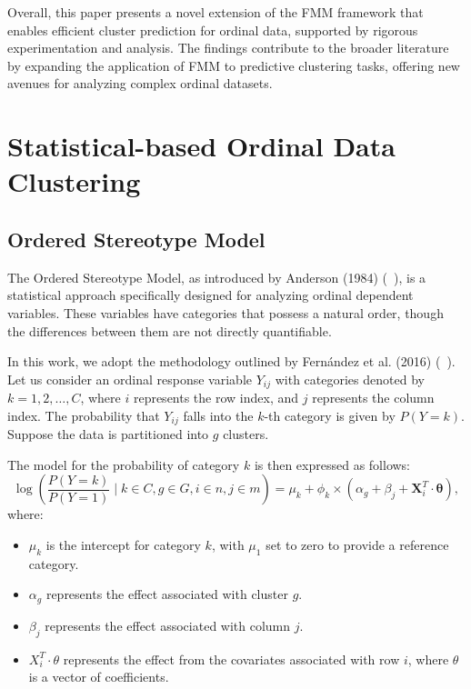 \documentclass{article}
\begin{document}
Overall, this paper presents a novel extension of the FMM framework that enables efficient cluster prediction for ordinal data, supported by rigorous experimentation and analysis. 
The findings contribute to the broader literature by expanding the application of FMM to predictive clustering tasks, offering new avenues for analyzing complex ordinal datasets.


\section{Statistical-based Ordinal Data Clustering}

\subsection{Ordered Stereotype Model}

The Ordered Stereotype Model, as introduced by Anderson (1984) (~\cite{anderson1984regression}), 
is a statistical approach specifically designed for analyzing ordinal dependent variables. 
These variables have categories that possess a natural order, 
though the differences between them are not directly quantifiable.

In this work, we adopt the methodology outlined by Fernández et al. (2016) (~\cite{fernandez2016mixture}). 
Let us consider an ordinal response variable \(Y_{ij}\) with categories denoted by \(k = 1, 2, \ldots, C\), 
where \(i\) represents the row index, and \(j\) represents the column index. 
The probability that \(Y_{ij}\) falls into the \(k\)-th category is given by \(P(Y = k)\). 
Suppose the data is partitioned into \(g\) clusters.

The model for the probability of category \(k\) is then expressed as follows:
\begin{equation}
  \log\left(\frac{P(Y = k)}{P(Y = 1)} \mid k \in C, g \in G, i \in n, j \in m\right) = \mu_k + \phi_k \times \left(\alpha_g + \beta_j + \bm{X}_i^T \cdot \bm{\theta} \right),
\end{equation}
where:

\begin{itemize}
    \item \(\mu_k\) is the intercept for category \(k\), with \(\mu_1\) set to zero to provide a reference category.
    \item \(\alpha_g\) represents the effect associated with cluster \(g\).
    \item \(\beta_j\) represents the effect associated with column \(j\).
    \item \(X_i^T \cdot \theta\) represents the effect from the covariates associated with row \(i\), where \(\theta\) is a vector of coefficients.
\end{itemize}
\end{document}
